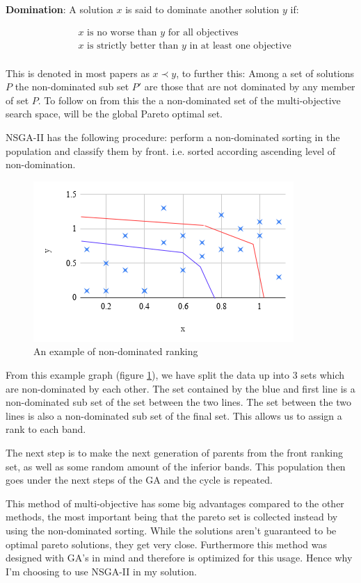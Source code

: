 \documentclass[11pt]{article}
\begin{document}
    \textbf{Domination}: A solution \(x\) is said to dominate another solution \(y\) if:

    \begin{align*}
        & x \text{ is no worse than } y \text{ for all objectives} \\
        & x \text{ is strictly better than } y \text{ in at least one objective} \\
    \end{align*}

    This is denoted in most papers as \(x \prec y\), to further this: Among a set of solutions \(P\)
    the non-dominated sub set \(P'\) are those that are not dominated by any member of
    set \(P\). To follow on from this the a non-dominated set of the multi-objective search
    space, will be the global Pareto optimal set.

    NSGA-II has the following procedure: perform a non-dominated sorting in the population
    and classify them by front. i.e. sorted according ascending level of non-domination.

    \begin{figure}[H]
        \centering
        \includegraphics[width=.6\textwidth]{NSGArank}
        \caption{An example of non-dominated ranking}\label{fig:NSGArank}
    \end{figure}
    From this example graph (figure \ref{fig:NSGArank}), we have split the data up into 3 sets
    which are non-dominated
    by each other. The set contained by the blue and first line is a non-dominated sub set
    of the set between the two lines. The set between the two lines is also a non-dominated
    sub set of the final set. This allows us to assign a rank to each band.

    The next step is to make the next generation of parents from the front ranking
    set, as well as some random amount of the inferior bands. This population
    then goes under the next steps of the GA and the cycle is repeated.

    This method of multi-objective has some big advantages compared to the other methods,
    the most important being that the pareto set is collected instead by using the non-dominated
    sorting. While the solutions aren't guaranteed to be optimal pareto solutions, they
    get very close. Furthermore this method was designed with GA's in mind and therefore is
    optimized for this usage. Hence why I'm choosing to use NSGA-II in my solution.
\end{document}
